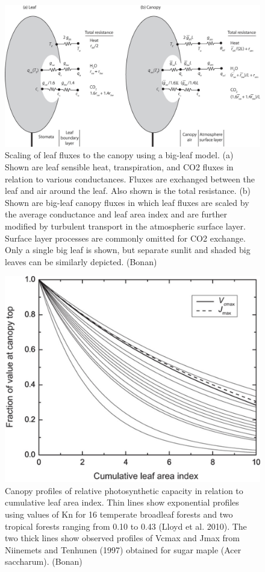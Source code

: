 \documentclass[
  oneside]{book}
\begin{document}
\begin{figure}

{\centering \includegraphics[width=0.8\linewidth]{figures/chap3/f323_bigleaf} 

}

\caption{Scaling of leaf fluxes to the canopy using a big-leaf model. (a) Shown are leaf sensible heat, transpiration, and CO2 fluxes in relation to various conductances. Fluxes are exchanged between the leaf and air around the leaf. Also shown is the total resistance. (b) Shown are big-leaf canopy fluxes in which leaf fluxes are scaled by the average conductance and leaf area index and are further modified by turbulent transport in the atmospheric surface layer. Surface layer processes are commonly omitted for CO2 exchange. Only a single big leaf is shown, but separate sunlit and shaded big leaves can be similarly depicted. (Bonan)}\label{fig:f323}
\end{figure}

\begin{figure}

{\centering \includegraphics[width=0.8\linewidth]{figures/chap3/f324_vcamx_profile} 

}

\caption{Canopy profiles of relative photosynthetic capacity in relation to cumulative leaf area index. Thin lines show exponential profiles using values of Kn for 16 temperate broadleaf forests and two tropical forests ranging from 0.10 to 0.43 (Lloyd et al. 2010). The two thick lines show observed profiles of Vcmax and Jmax from Niinemets and Tenhunen (1997) obtained for sugar maple (Acer saccharum). (Bonan)}\label{fig:f324}
\end{figure}
\end{document}
